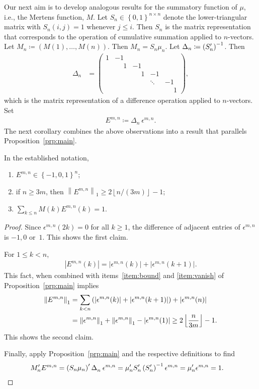 \documentclass[12pt,reqno]{article}
\newcommand{\abs}[1]{\ensuremath{\left|{#1}\right|}}
\newcommand\floor[1]{\left\lfloor#1\right\rfloor}
\newcommand{\paren}[1]{\left\lparen{#1}\right\rparen}
\newcommand{\norm}[1]{\ensuremath{\left\|{#1}\right\|}}
\newcommand{\set}[1]{\ensuremath{\left\{{#1}\right\}}}
\begin{document}
Our next aim is to develop analogous results for 
the summatory function of $\mu$, {i.e.}, the Mertens function, $M$.
Let $S_{n}\in\set{0,1}^{n\times n}$ denote the lower-triangular matrix with $S_n(i,j)=1$ whenever $j\leq i$.
Then $S_n$ is the matrix representation
that corresponds to the operation of cumulative summation applied to $n$-vectors.
Let $M_n\coloneqq (M(1),\ldots,M(n))$. Then $M_n = S_n\mu_n$.
Let $\Delta_n\coloneqq \paren{S_{n}'}^{-1}$. Then 
\begin{align}
\Delta_n &= \begin{pmatrix}
1 &          -1 \\
  &\phantom{-}1 & -1\\
  &             & \phantom{-}1 & -1\\
  &             &  & \ddots &-1\\
  &             &  &   &\phantom{-}1
\end{pmatrix},
\label{eqn:deltan}
\end{align}
which is the matrix representation of a difference operation applied to $n$-vectors.  Set 
\begin{align*}
E^{m,n}\coloneqq \Delta_n^{\phantom{m}}\epsilon^{m,n}. 
\end{align*}
The next corollary combines the above observations into a result that parallels Proposition~\ref{prp:main}.
\begin{corollary}
In the established notation,
\begin{enumerate}
\item $E^{m,n}\in\set{-1,0,1}^n$;
\item if $n\geq 3m$, then $\norm{E^{m,n}}_1\geq 2\floor{n/(3m)}-1$;
\item $\sum_{k\leq n} M(k) E^{m,n}(k)=1$.
\end{enumerate}
\label{cor:main}
\end{corollary}
\begin{proof}
Since $\epsilon^{m,n}(2k)=0$ for all $k\geq 1$, the difference of adjacent entries of 
$\epsilon^{m,n}$ is $-1,0$ or~$1$. This shows the first claim.

For $1\leq k<n$,
\begin{align*}
\abs{E^{m,n}(k)} = \abs{\epsilon^{m,n}(k)} + \abs{\epsilon^{m,n}(k+1)}.
\end{align*}
This fact, when combined with items~\ref{item:bound} and \ref{item:vanish} of Proposition~\ref{prp:main} implies
\begin{align*}
\norm{E^{m,n}}_1 &= \sum_{k<n}\paren{ \abs{\epsilon^{m,n}(k)} + \abs{\epsilon^{m,n}(k+1)}} + \abs{\epsilon^{m,n}(n)}\\
&=\norm{\epsilon^{m,n}}_1 + \norm{\epsilon^{m,n}}_1 -\abs{\epsilon^{m,n}(1)} 
\geq 2\floor{\frac{n}{3m}}-1.
\end{align*}
This shows the second claim.

Finally, apply Proposition~\ref{prp:main} and the respective definitions to find
\begin{align*}
M'_n E^{m,n}  &= \paren{S_n\mu_n}' \Delta^{\phantom{m}}_n\epsilon^{m,n}
= \mu_n' S_n' \paren{S_{n}'}^{-1}\epsilon^{m,n}
= \mu_n'\epsilon^{m,n}
= 1.
\qedhere\end{align*}
\end{proof}
\end{document}
